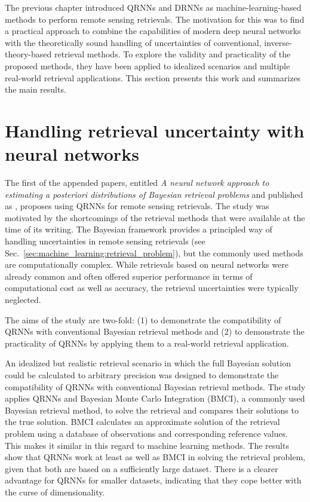 
The previous chapter introduced QRNNs and DRNNs as machine-learning-based
methods to perform remote sensing retrievals. The motivation for this was to
find a practical approach to combine the capabilities of modern deep neural
networks with the theoretically sound handling of uncertainties of conventional,
inverse-theory-based retrieval methods. To explore the validity and practicality
of the proposed methods, they have been applied to idealized scenarios and
multiple real-world retrieval applications. This section presents this work and
summarizes the main results.

\section{Handling retrieval uncertainty with neural networks}

The first of the appended papers, entitled \textit{A neural network approach to
estimating a posteriori distributions of Bayesian retrieval problems} and
published as \citet{pfreundschuh18}, proposes using  QRNNs for remote
sensing retrievals. The study was motivated by the shortcomings of the
retrieval methods that were available at the time of its writing. The Bayesian
framework provides a principled way of handling uncertainties in remote
sensing retrievals (see Sec.~\ref{sec:machine_learning:retrieval_problem}),
but the commonly used methods are computationally complex. While retrievals
based on neural networks were already common and often offered superior
performance in terms of computational cost as well as accuracy, the retrieval
uncertainties were typically neglected.

The aims of the study are two-fold: (1) to demonstrate the compatibility of
QRNNs with conventional Bayesian retrieval methods and (2) to demonstrate the
practicality of QRNNs by applying them to a real-world retrieval application.

An idealized but realistic retrieval scenario in which the full Bayesian
solution could be calculated to arbitrary precision was designed to demonstrate
the compatibility of QRNNs with conventional Bayesian retrieval methods. The
study applies QRNNs and Bayesian Monte Carlo Integration (BMCI), a commonly used
Bayesian retrieval method, to solve the retrieval and compares their solutions
to the true solution. BMCI calculates an approximate solution of the retrieval
problem using a database of observations and corresponding reference values.
This makes it similar in this regard to machine learning methods. The results
show that QRNNs work at least as well as BMCI in solving the retrieval problem,
given that both are based on a sufficiently large dataset. There is a clearer
advantage for QRNNs for smaller datasets, indicating that they cope better with
the curse of dimensionality.

